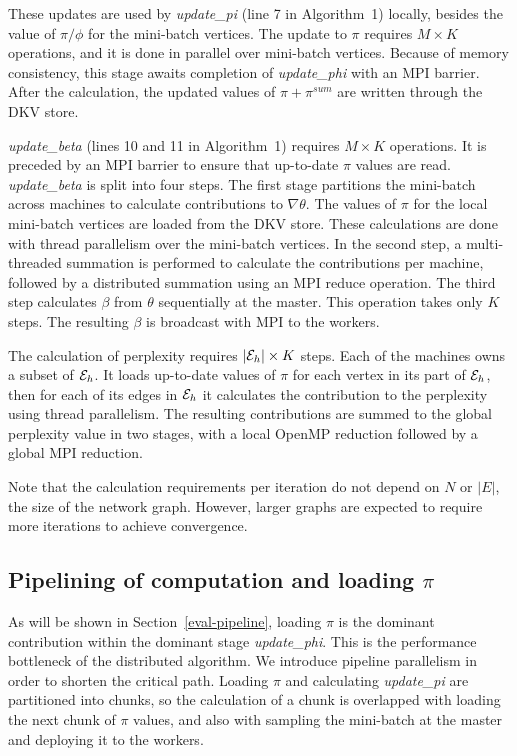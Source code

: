 These updates are used by \textit{update\_pi} (line 7 in Algorithm~1) locally, besides the value of
$\pi/\phi$ for the mini-batch vertices. The update to $\pi$ requires $M\times
K$ operations, and it is done in parallel over mini-batch vertices. Because of
memory consistency, this stage awaits completion of \textit{update\_phi} with
an MPI barrier. After the calculation, the updated values of $\pi+\pi^{sum}$
are written through the DKV store.

\textit{update\_beta} (lines 10 and 11 in Algorithm~1) requires $M\times K$ operations. It is preceded by an MPI
barrier to ensure that up-to-date $\pi$ values are read. \textit{update\_beta}
is split into four steps. The first stage partitions the mini-batch across
machines to calculate contributions to $\nabla\theta$. The values of $\pi$ for
the local mini-batch vertices are loaded from the DKV store. These calculations
are done with thread parallelism over the mini-batch vertices. In the second step,
a multi-threaded summation is performed to calculate the contributions per
machine, followed by a distributed summation using an MPI reduce operation. The
third step calculates $\beta$ from $\theta$ sequentially at the master. This
operation takes only $K$ steps. The resulting $\beta$ is broadcast with MPI
to the workers.

The calculation of perplexity requires $|\cE_h|\times K$ steps. Each of the
machines owns a subset of $\cE_h$. It loads up-to-date values of $\pi$ for each
vertex in its part of $\cE_h$, then for each of its edges in $\cE_h$ it calculates the
contribution to the perplexity using thread parallelism. The resulting
contributions are summed to the global perplexity value in two stages,
with a local OpenMP reduction followed by a global MPI reduction.

Note that the calculation requirements per iteration do not depend
on $N$ or $|E|$, the size of the network graph. However, larger graphs are
expected to require more iterations to achieve convergence.

\subsection{Pipelining of computation and loading $\pi$}

As will be shown in Section~\ref{eval-pipeline}, loading $\pi$ is the
dominant contribution within the dominant stage \textit{update\_phi}. This
is the performance bottleneck of the distributed algorithm. We introduce
pipeline parallelism in order to shorten the critical path. Loading $\pi$
and calculating \textit{update\_pi} are partitioned into chunks, so the
calculation of a chunk is overlapped with loading the next chunk of $\pi$
values, and also with sampling the mini-batch at the master and deploying
it to the workers.

